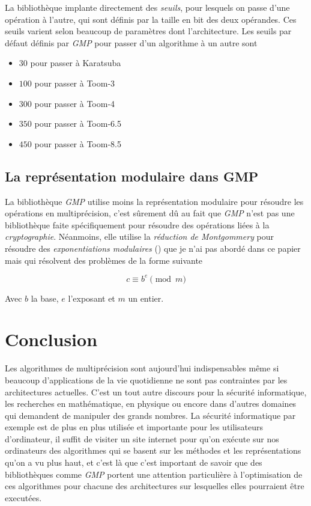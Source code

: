 \documentclass[letterpaper]{article}
\begin{document}
La bibliothèque implante directement des \emph{seuils}, pour lesquels
on passe d'une opération à l'autre, qui sont définis par la taille en bit des
deux opérandes. Ces seuils varient selon beaucoup de paramètres dont
l'architecture. Les seuils par défaut définis par \emph{GMP} pour passer d'un
algorithme à un autre sont

\begin{itemize}
  \item $30$ pour passer à Karatsuba
  \item $100$ pour passer à Toom-3
  \item $300$ pour passer à Toom-4
  \item $350$ pour passer à Toom-6.5
  \item $450$ pour passer à Toom-8.5
\end{itemize}

\subsection{La représentation modulaire dans GMP}

La bibliothèque \emph{GMP} utilise moins la représentation modulaire pour résoudre les
opérations en multiprécision, c'est sûrement dû au fait que \emph{GMP} n'est pas
une bibliothèque faite spécifiquement pour résoudre des opérations liées à la
\emph{cryptographie}. Néanmoins, elle utilise la \emph{réduction de Montgommery}
pour résoudre des \emph{exponentiations modulaires} (\cite{gmplibmodularpowering}) que
je n'ai pas abordé dans ce papier mais qui résolvent des problèmes de la forme
suivante

$$c \equiv b^{e} \pmod {m}$$

Avec $b$ la base, $e$ l'exposant et $m$ un entier.

\section{Conclusion}

Les algorithmes de multiprécision sont aujourd'hui indispensables même si
beaucoup d'applications de la vie quotidienne ne sont pas contraintes par les
architectures actuelles. C'est un tout autre discours pour la sécurité
informatique, les recherches en mathématique, en physique ou encore dans
d'autres domaines qui demandent de manipuler des grands nombres. La sécurité
informatique par exemple est de plus en plus utilisée et importante pour
les utilisateurs d'ordinateur, il suffit de visiter un site internet pour
qu'on exécute sur nos ordinateurs des algorithmes qui se basent sur les
méthodes et les représentations qu'on a vu plus haut, et c'est là que c'est
important de savoir que des bibliothèques comme \emph{GMP} portent une attention
particulière à l'optimisation de ces algorithmes pour chacune des architectures
sur lesquelles elles pourraient être executées.\\
\end{document}
